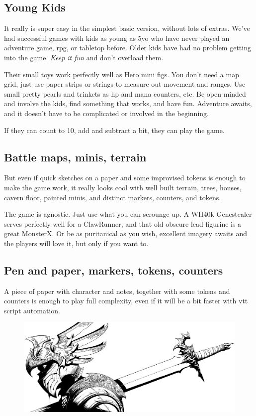 \subsection*{Young Kids} 

It really is super easy in the simplest basic version, without lots of extras. We've had successful games with kids as young as 5yo who have never played an adventure game, rpg, or tabletop before. Older kids have had no problem getting into the game. \emph{Keep it fun} and don't overload them.

Their small toys work perfectly well as Hero mini figs. You don't need a map grid, just use paper strips or strings to measure out movement and ranges. Use small pretty pearls and trinkets as hp and mana counters, etc. Be open minded and involve the kids, find something that works, and have fun. Adventure awaits, and it doesn't have to be complicated or involved in the beginning.

If they can count to 10, add and subtract a bit, they can play the game.


\subsection*{Battle maps, minis, terrain}

But even if quick sketches on a paper and some improvised tokens is enough to make the game work, it really looks cool with well built terrain, trees, houses, cavern floor, painted minis, and distinct markers, counters, and tokens.

The game is agnostic. Just use what you can scrounge up. A WH40k Genestealer serves perfectly well for a ClawRunner, and that old obscure lead figurine is a great MonsterX. 
Or be as puritanical as you wish, excellent imagery awaits and the players will love it, but only if you want to.


\subsection*{Pen and paper, markers, tokens, counters}

A piece of paper with character and notes, together with some tokens and counters is enough to play full complexity, even if it will be a bit faster with vtt script automation.


\begin{figure}[b]
\centering
\includegraphics[width=120mm]{./fig/deadhero.jpg}
\end{figure}








